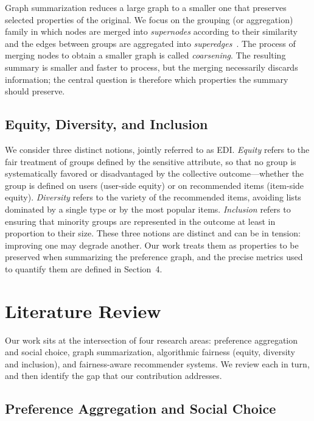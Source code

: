 \documentclass[a4paper,fleqn]{cas-dc}
\begin{document}
Graph summarization reduces a large graph to a smaller one that preserves
selected properties of the original. We focus on the grouping (or
aggregation) family in which nodes are merged into \emph{supernodes}
according to their similarity and the edges between groups are aggregated
into \emph{superedges}~\cite{liu_graph_2018}. The process of merging nodes
to obtain a smaller graph is called \emph{coarsening}. The resulting summary
is smaller and faster to process, but the merging necessarily discards
information; the central question is therefore which properties the summary
should preserve.

\subsection{Equity, Diversity, and Inclusion}

We consider three distinct notions, jointly referred to as EDI. \emph{Equity}
refers to the fair treatment of groups defined by the sensitive attribute,
so that no group is systematically favored or disadvantaged by the collective
outcome—whether the group is defined on users (user-side equity) or on
recommended items (item-side equity). \emph{Diversity} refers to the variety
of the recommended items, avoiding lists dominated by a single type or by
the most popular items. \emph{Inclusion} refers to ensuring that minority
groups are represented in the outcome at least in proportion to their size.
These three notions are distinct and can be in tension: improving one may
degrade another. Our work treats them as properties to be preserved when
summarizing the preference graph, and the precise metrics used to quantify
them are defined in Section~4.


\section{Literature Review}\label{sec:litreview} Our work sits at the intersection of four research areas: preference
aggregation and social choice, graph summarization, algorithmic fairness
(equity, diversity and inclusion), and fairness-aware recommender systems.
We review each in turn, and then identify the gap that our contribution
addresses.

\subsection{Preference Aggregation and Social Choice}
\end{document}
